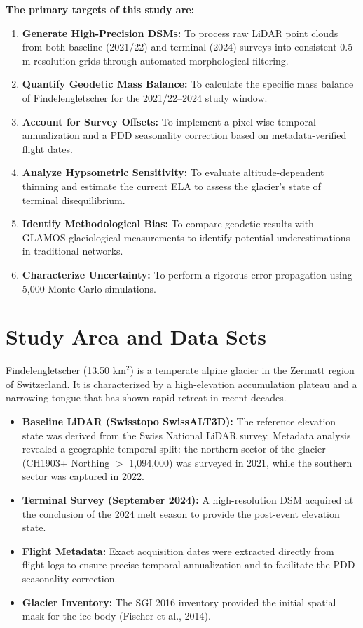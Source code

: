 \documentclass[12pt, a4paper]{article}
\begin{document}
	\textbf{The primary targets of this study are:}
	\begin{enumerate}
		\item \textbf{Generate High-Precision DSMs:} To process raw LiDAR point clouds from both baseline (2021/22) and terminal (2024) surveys into consistent 0.5 m resolution grids through automated morphological filtering.
		\item \textbf{Quantify Geodetic Mass Balance:} To calculate the specific mass balance of Findelengletscher for the 2021/22--2024 study window.
		\item \textbf{Account for Survey Offsets:} To implement a pixel-wise temporal annualization and a PDD seasonality correction based on metadata-verified flight dates.
		\item \textbf{Analyze Hypsometric Sensitivity:} To evaluate altitude-dependent thinning and estimate the current ELA to assess the glacier's state of terminal disequilibrium.
		\item \textbf{Identify Methodological Bias:} To compare geodetic results with GLAMOS glaciological measurements to identify potential underestimations in traditional networks.
		\item \textbf{Characterize Uncertainty:} To perform a rigorous error propagation using 5,000 Monte Carlo simulations.
	\end{enumerate}
	
	\section{Study Area and Data Sets}
	Findelengletscher (13.50 km$^2$) is a temperate alpine glacier in the Zermatt region of Switzerland. It is characterized by a high-elevation accumulation plateau and a narrowing tongue that has shown rapid retreat in recent decades.
	
	\begin{itemize}
		\item \textbf{Baseline LiDAR (Swisstopo SwissALT3D):} The reference elevation state was derived from the Swiss National LiDAR survey. Metadata analysis revealed a geographic temporal split: the northern sector of the glacier (CH1903+ Northing $>$ 1,094,000) was surveyed in 2021, while the southern sector was captured in 2022.
		\item \textbf{Terminal Survey (September 2024):} A high-resolution DSM acquired at the conclusion of the 2024 melt season to provide the post-event elevation state.
		\item \textbf{Flight Metadata:} Exact acquisition dates were extracted directly from flight logs to ensure precise temporal annualization and to facilitate the PDD seasonality correction.
		\item \textbf{Glacier Inventory:} The SGI 2016 inventory provided the initial spatial mask for the ice body (Fischer et al., 2014).
	\end{itemize}
	
\end{document}
